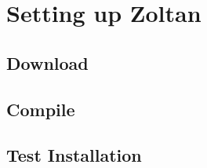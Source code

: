%
%
\chapter{Setting up Zoltan}

\section{Download}

\section{Compile}

\section{Test Installation}
